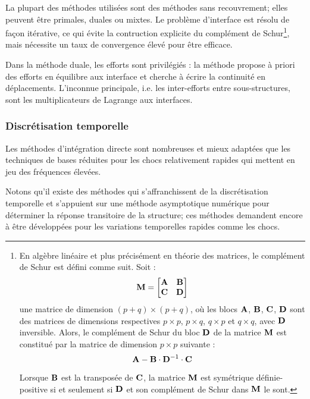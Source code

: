 La plupart des méthodes utilisées sont des méthodes sans recouvrement; elles
peuvent être primales, duales ou mixtes. Le problème d'interface est résolu
de façon itérative, ce qui évite la contruction explicite du complément
de Schur\footnote{%
En algèbre linéaire et plus précisément en théorie des matrices, le complément de 
Schur est défini comme suit. Soit :
\begin{equation} \MM{M}=\MM*{\MM{A} & \MM{B} \\ \MM{C} & \MM{D}} \end{equation}
une matrice de dimension $(p+q)\times(p+q)$, où les blocs $\MM{A}$, $\MM{B}$, $\MM{C}$, $\MM{D}$ sont des matrices 
de dimensions respectives $p\times p$, $p\times q$, $q\times p$ et $q\times q$, avec $\MM{D}$ inversible. 
Alors, le complément de Schur du bloc $\MM{D}$ de la matrice $\MM{M}$ est constitué par la matrice 
de dimension $p\times p$ suivante :
\begin{equation} \MM{A} - \MM{B}\cdot \MMI{D}\cdot \MM{C}\end{equation}

Lorsque $\MM{B}$ est la transposée de $\MM{C}$, la matrice $\MM{M}$ est symétrique définie-positive
si et seulement si $\MM{D}$ et son complément de Schur dans $\MM{M}$ le sont.
}, mais nécessite un taux de convergence élevé pour être
efficace.

Dans la méthode duale, les efforts sont privilégiés : la méthode propose
à priori des efforts en équilibre aux interface et cherche à écrire la continuité
en déplacements. L'inconnue principale, i.e. les inter-efforts entre sous-structures,
sont les multiplicateurs de Lagrange aux interfaces.

\medskip
\subsubsection{Discrétisation temporelle}

Les méthodes d'intégration directe sont nombreuses et mieux adaptées que les
techniques de bases réduites pour les chocs relativement rapides qui mettent en jeu des 
fréquences élevées.

Notons qu'il existe des méthodes qui s'affranchissent de la discrétisation temporelle et
s'appuient sur une méthode asymptotique numérique pour déterminer la réponse
transitoire de la structure; ces méthodes demandent encore à être
développées pour les variations temporelles rapides comme les chocs.

